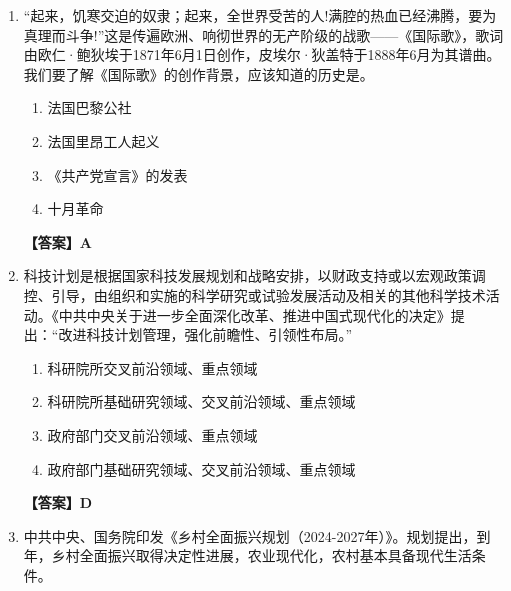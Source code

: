 \documentclass[UTF8,11pt,a4paper]{ctexart}
\begin{document}
\begin{enumerate}[label=\textbf{\arabic*.}, leftmargin=2.5em, itemsep=0.7em]
\begin{enumerate}[label=\Alph*., leftmargin=2em, itemsep=0.1em, topsep=0.15em]
\item 一切为了人民、一切依靠人民
\item 以人民利益为中心
\item 团结各族人民
\item 接受人民群众监督
\end{enumerate}
\textbf{【答案】A}
\item “起来，饥寒交迫的奴隶；起来，全世界受苦的人!满腔的热血已经沸腾，要为真理而斗争!”这是传遍欧洲、响彻世界的无产阶级的战歌——《国际歌》，歌词由欧仁·鲍狄埃于1871年6月1日创作，皮埃尔·狄盖特于1888年6月为其谱曲。我们要了解《国际歌》的创作背景，应该知道的历史是\allowbreak\underline{\hspace{4em}}。
\begin{enumerate}[label=\Alph*., leftmargin=2em, itemsep=0.1em, topsep=0.15em]
\item 法国巴黎公社
\item 法国里昂工人起义
\item 《共产党宣言》的发表
\item 十月革命
\end{enumerate}
\textbf{【答案】A}
\item 科技计划是根据国家科技发展规划和战略安排，以财政支持或以宏观政策调控、引导，由\allowbreak\underline{\hspace{4em}}组织和实施的科学研究或试验发展活动及相关的其他科学技术活动。《中共中央关于进一步全面深化改革、推进中国式现代化的决定》提出：“改进科技计划管理，强化\allowbreak\underline{\hspace{4em}}前瞻性、引领性布局。”
\begin{enumerate}[label=\Alph*., leftmargin=2em, itemsep=0.1em, topsep=0.15em]
\item 科研院所交叉前沿领域、重点领域
\item 科研院所基础研究领域、交叉前沿领域、重点领域
\item 政府部门交叉前沿领域、重点领域
\item 政府部门基础研究领域、交叉前沿领域、重点领域
\end{enumerate}
\textbf{【答案】D}
\item 中共中央、国务院印发《乡村全面振兴规划（2024-2027年）》。规划提出，到\allowbreak\underline{\hspace{4em}}年，乡村全面振兴取得决定性进展，农业现代化\allowbreak\underline{\hspace{4em}}，农村基本具备现代生活条件。
\begin{enumerate}[label=\Alph*., leftmargin=2em, itemsep=0.1em, topsep=0.15em]

\end{enumerate}
\end{enumerate}
\end{document}
